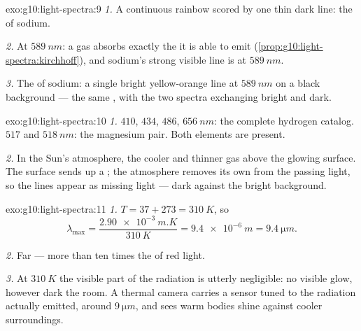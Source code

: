 \begin{solution}{exo:g10:light-spectra:9}
\emph{1.} A continuous rainbow scored by one thin dark line: the
 of sodium.

\emph{2.} At $\qty{589}{nm}$: a gas absorbs exactly the  it is
able to emit (\cref{prop:g10:light-spectra:kirchhoff}), and sodium's
strong visible line is at $\qty{589}{nm}$.

\emph{3.} The  of sodium: a single bright yellow-orange
line at $\qty{589}{nm}$ on a black background --- the same ,
with the two spectra exchanging bright and dark.
\end{solution}

\begin{solution}{exo:g10:light-spectra:10}
\emph{1.} $410$, $434$, $486$, $\qty{656}{nm}$: the complete hydrogen
catalog. $517$ and $\qty{518}{nm}$: the magnesium pair. Both elements are
present.

\emph{2.} In the Sun's atmosphere, the cooler and thinner gas above the
glowing surface. The surface sends up a ; the
atmosphere removes its own  from the passing light, so the
lines appear as missing light --- dark against the bright background.
\end{solution}

\begin{solution}{exo:g10:light-spectra:11}
\emph{1.} $T = 37 + 273 = \qty{310}{K}$, so
\[
\lambda_{\max} = \frac{\qty{2.90e-3}{m.K}}{\qty{310}{K}}
= \qty{9.4e-6}{m} = \qty{9.4}{\micro m}.
\]

\emph{2.} Far  --- more than ten times the  of red
light.

\emph{3.} At $\qty{310}{K}$ the visible part of the radiation is
utterly negligible: no visible glow, however dark the room. A thermal
camera carries a sensor tuned to the radiation actually emitted, around
$\qty{9}{\micro m}$, and sees warm bodies shine against cooler
surroundings.
\end{solution}

